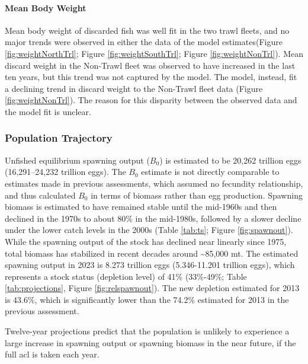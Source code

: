 \documentclass[11pt,
  english,
  letterpaper,
]{article}
\begin{document}
\hypertarget{mean-body-weight}{%
\paragraph{Mean Body Weight}\label{mean-body-weight}}

Mean body weight of discarded fish was well fit in the two trawl fleets, and no major trends were observed in either the data of the model estimates(Figure \ref{fig:weightNorthTrl}; Figure \ref{fig:weightSouthTrl}; Figure \ref{fig:weightNonTrl}). Mean discard weight in the Non-Trawl fleet was observed to have increased in the last ten years, but this trend was not captured by the model. The model, instead, fit a declining trend in discard weight to the Non-Trawl fleet data (Figure \ref{fig:weightNonTrl}). The reason for this disparity between the observed data and the model fit is unclear.

\hypertarget{population-trajectory}{%
\subsubsection{Population Trajectory}\label{population-trajectory}}

Unfished equilibrium spawning output (\(B_0\)) is estimated to be 20,262 trillion eggs (16,291--24,232 trillion eggs). The \(B_0\) estimate is not directly comparable to estimates made in previous assessments, which assumed no fecundity relationship, and thus calculated \(B_0\) in terms of biomass rather than egg production. Spawning biomass is estimated to have remained stable until the mid-1960s and then declined in the 1970s to about 80\% in the mid-1980s, followed by a slower decline under the lower catch levels in the 2000s (Table \ref{tab:ts}; Figure \ref{fig:spawnout}). While the spawning output of the stock has declined near linearly since 1975, total biomass has stabilized in recent decades around \textasciitilde85,000 mt. The estimated spawning output in 2023 is 8.273 trillion eggs (5.346-11.201 trillion eggs), which represents a stock status (depletion level) of 41\% (33\%-49\%; Table \ref{tab:projections}, Figure \ref{fig:relspawnout}). The new depletion estimated for 2013 is 43.6\%, which is significantly lower than the 74.2\% estimated for 2013 in the previous assessment.

Twelve-year projections predict that the population is unlikely to experience a large increase in spawning output or spawning biomass in the near future, if the full \gls{acl} is taken each year.
\end{document}
